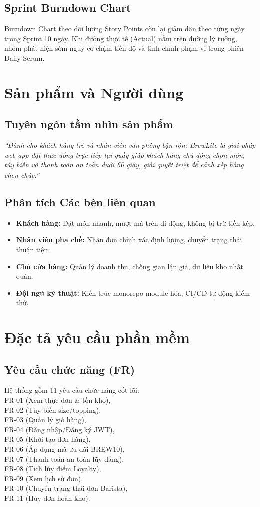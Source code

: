 \documentclass[a4paper]{article}
\begin{document}
\subsection{Sprint Burndown Chart}
Burndown Chart theo dõi lượng Story Points còn lại giảm dần theo từng ngày trong Sprint 10 ngày. Khi đường thực tế (Actual) nằm trên đường lý tưởng, nhóm phát hiện sớm nguy cơ chậm tiến độ và tinh chỉnh phạm vi trong phiên Daily Scrum.

\section{Sản phẩm và Người dùng}
\subsection{Tuyên ngôn tầm nhìn sản phẩm}
\textit{``Dành cho khách hàng trẻ và nhân viên văn phòng bận rộn; BrewLite là giải pháp web app đặt thức uống trực tiếp tại quầy giúp khách hàng chủ động chọn món, tùy biến và thanh toán an toàn dưới 60 giây, giải quyết triệt để cảnh xếp hàng chen chúc.''}

\subsection{Phân tích Các bên liên quan}
\begin{itemize}
    \item \textbf{Khách hàng:} Đặt món nhanh, mượt mà trên di động, không bị trừ tiền kép.
    \item \textbf{Nhân viên pha chế:} Nhận đơn chính xác định lượng, chuyển trạng thái thuận tiện.
    \item \textbf{Chủ cửa hàng:} Quản lý doanh thu, chống gian lận giá, dữ liệu kho nhất quán.
    \item \textbf{Đội ngũ kỹ thuật:} Kiến trúc monorepo module hóa, CI/CD tự động kiểm thử.
\end{itemize}

\section{Đặc tả yêu cầu phần mềm}
\subsection{Yêu cầu chức năng (FR)}
Hệ thống gồm 11 yêu cầu chức năng cốt lõi: \\
FR-01 (Xem thực đơn \& tồn kho), \\
FR-02 (Tùy biến size/topping), \\
FR-03 (Quản lý giỏ hàng), \\
FR-04 (Đăng nhập/Đăng ký JWT), \\
FR-05 (Khởi tạo đơn hàng), \\
FR-06 (Áp dụng mã ưu đãi BREW10), \\ 
FR-07 (Thanh toán an toàn lũy đẳng), \\
FR-08 (Tích lũy điểm Loyalty), \\
FR-09 (Xem lịch sử đơn), \\
FR-10 (Chuyển trạng thái đơn Barista), \\
FR-11 (Hủy đơn hoàn kho).
\end{document}
